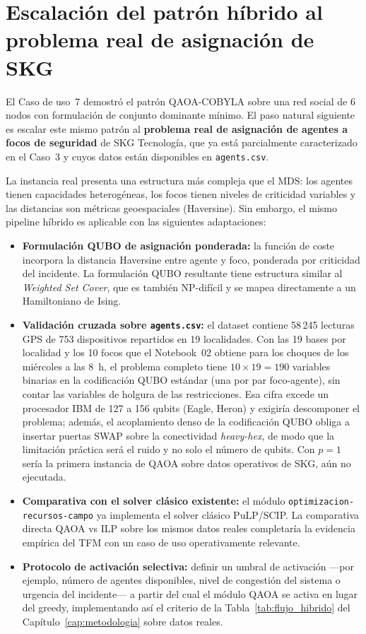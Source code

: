 \section{Escalación del patrón híbrido al problema real de asignación de SKG}

El Caso de uso~7 demostró el patrón QAOA-COBYLA sobre una red social de 6 nodos con formulación de conjunto dominante mínimo. El paso natural siguiente es escalar este mismo patrón al \textbf{problema real de asignación de agentes a focos de seguridad} de SKG Tecnología, que ya está parcialmente caracterizado en el Caso~3 y cuyos datos están disponibles en \texttt{agents.csv}.

La instancia real presenta una estructura más compleja que el MDS: los agentes tienen capacidades heterogéneas, los focos tienen niveles de criticidad variables y las distancias son métricas geoespaciales (Haversine). Sin embargo, el mismo pipeline híbrido es aplicable con las siguientes adaptaciones:

\begin{itemize}
    \item \textbf{Formulación QUBO de asignación ponderada:} la función de coste incorpora la distancia Haversine entre agente y foco, ponderada por criticidad del incidente. La formulación QUBO resultante tiene estructura similar al \textit{Weighted Set Cover}, que es también NP-difícil \citep{garey1979} y se mapea directamente a un Hamiltoniano de Ising.

    \item \textbf{Validación cruzada sobre \texttt{agents.csv}:} el dataset contiene 58\,245 lecturas GPS de 753 dispositivos repartidos en 19 localidades. Con las 19 bases por localidad y los 10 focos que el Notebook~02 obtiene para los choques de los miércoles a las 8~h, el problema completo tiene $10\times19=190$ variables binarias en la codificación QUBO estándar (una por par foco-agente), sin contar las variables de holgura de las restricciones. Esa cifra excede un procesador IBM de 127 a 156 qubits (Eagle, Heron) y exigiría descomponer el problema; además, el acoplamiento denso de la codificación QUBO obliga a insertar puertas SWAP sobre la conectividad \textit{heavy-hex}, de modo que la limitación práctica será el ruido y no solo el número de qubits. Con $p = 1$ sería la primera instancia de QAOA sobre datos operativos de SKG, aún no ejecutada.

    \item \textbf{Comparativa con el solver clásico existente:} el módulo \texttt{optimizacion-recursos-campo} ya implementa el solver clásico PuLP/SCIP. La comparativa directa QAOA vs ILP sobre los mismos datos reales completaría la evidencia empírica del TFM con un caso de uso operativamente relevante.

    \item \textbf{Protocolo de activación selectiva:} definir un umbral de activación —por ejemplo, número de agentes disponibles, nivel de congestión del sistema o urgencia del incidente— a partir del cual el módulo QAOA se activa en lugar del greedy, implementando así el criterio de la Tabla~\ref{tab:flujo_hibrido} del Capítulo~\ref{cap:metodologia} sobre datos reales.
\end{itemize}


